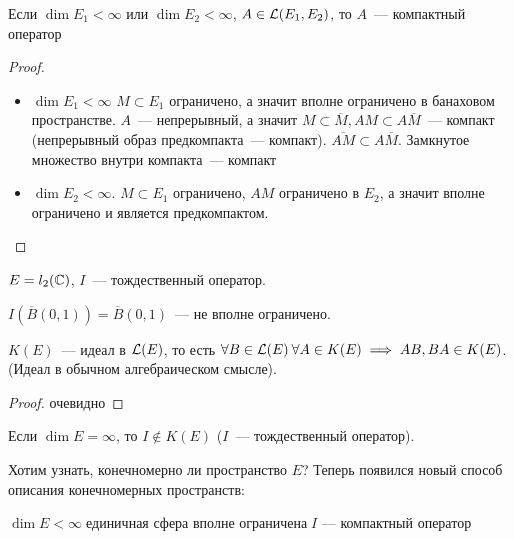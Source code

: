 \begin{statement}[1]
Если $\dim E_1 < \infty$ или $\dim E_2 < \infty$,
$A \in \mathcal{L}(E_1, E_2)$, то $A$~--- компактный оператор
\end{statement}

\begin{proof}
\begin{itemize}
    \item $\dim E_1 < \infty$
        $M \subset E_1$ ограничено, а значит вполне ограничено в банаховом пространстве. $A$~--- непрерывный, а значит
        $M \subset \overline{M}, AM \subset A\overline{M}$~--- компакт (непрерывный образ предкомпакта~--- компакт). $\overline{AM} \subset A\overline{M}$.
        Замкнутое множество внутри компакта~--- компакт
    \item $\dim E_2 < \infty$. $M \subset E_1$ ограничено, $AM$ ограничено в $E_2$, а значит вполне ограничено и является предкомпактом.
\end{itemize}
\end{proof}

\begin{example}
$E = l_2(\mathbb{C})$, $I$~--- тождественный оператор.

$I(\overline{B}(0, 1)) = \overline{B}(0, 1)$~--- не вполне ограничено.
\end{example}

\begin{statement}[2]
    $K(E)$~--- идеал в $\mathcal{L}(E)$, то есть $\forall B \in \mathcal{L}(E) \: \forall A \in K(E) \implies AB, BA \in K(E)$. (Идеал в обычном алгебраическом смысле).
\end{statement}


\begin{proof}
очевидно  %
\end{proof}

\begin{statement}[3]
Если $\dim E = \infty$, то $I \not \in K(E)$ ($I$~--- тождественный оператор).
\end{statement}

\begin{note}
Хотим узнать, конечномерно ли пространство $E$?
Теперь появился новый способ описания конечномерных пространств:

$\dim E < \infty \; \text{единичная сфера вполне ограничена} \;  I\text{~--- компактный оператор}$
\end{note}

